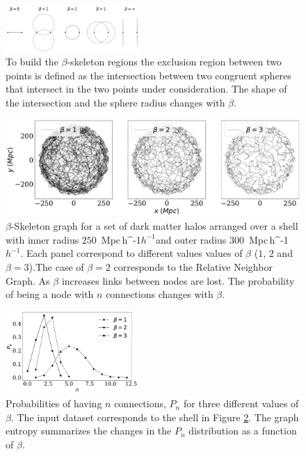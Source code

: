 \documentclass[fleqn,usenatbib]{mnras}
\newcommand{\Mpch}{\,{\rm Mpc}\,\ifmmode h^{-1}\else $h^{-1}$\fi}
\begin{document}
\begin{figure}
    \centering
    \includegraphics[width=0.45\textwidth]{betas.pdf}
   \caption{To build the $\beta$-skeleton regions 
     the exclusion region between two points is defined as the
     intersection between two congruent spheres that intersect in the
     two points under consideration. 
     The shape of the intersection and the sphere radius changes with
     $\beta$.
 \label{fig:example}}  
\end{figure} 

\begin{figure}
    \centering
    \includegraphics[width=1.0\textwidth]{beta123_2.pdf}
    \caption{$\beta$-Skeleton graph for a set of dark matter halos arranged over a shell
    with inner radius $250$ \Mpch and outer radius $300$ \Mpch.
    Each panel correspond to different values values of $\beta$ ($1$, $2$ and $\beta=3$).The case of $\beta=2$ corresponds to the Relative Neighbor Graph.
    As $\beta$ increases links between nodes are lost. The probability of being a node with $n$ connections changes with $\beta$.}
\label{fig:connectionsBeta}
\end{figure}

\begin{figure}
    \includegraphics[width=0.45\textwidth]{probabilities.pdf}
    \caption{Probabilities of having $n$ connections, $P_n$ for three different values of
    $\beta$. The input dataset corresponds to the shell in Figure \ref{fig:connectionsBeta}.
    The graph entropy summarizes the changes in the $P_n$ distribution as a function of $\beta$.}
    \label{fig:probabilities}
\end{figure}
\end{document}
